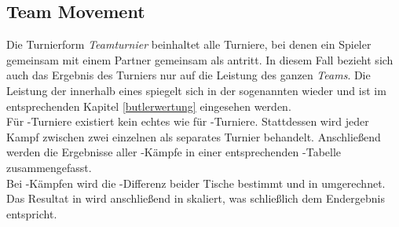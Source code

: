 \subsection{Team Movement}\label{team movement}

\noindent
Die Turnierform \textit{Teamturnier} beinhaltet alle Turniere, bei denen ein Spieler
gemeinsam mit einem Partner gemeinsam als \te antritt. In diesem Fall bezieht sich
auch das Ergebnis des Turniers nur auf die Leistung des ganzen \textit{Teams}.
Die Leistung der \pas innerhalb eines \te spiegelt sich in der sogenannten \bw wieder
und ist im entsprechenden Kapitel \ref{butlerwertung} eingesehen werden.\\[.2cm]

\noindent
Für \te-Turniere existiert kein echtes \bms wie für \pa-Turniere. Stattdessen wird
jeder Kampf zwischen zwei einzelnen \tes als separates Turnier behandelt. Anschließend
werden die Ergebnisse aller \te-Kämpfe in einer entsprechenden \vp-Tabelle
zusammengefasst.\\[.2cm]

\noindent
Bei \te-Kämpfen wird die \scy-Differenz beider Tische bestimmt und in \imps umgerechnet.
Das Resultat in \imps wird anschließend in \vps skaliert, was schließlich dem
Endergebnis entspricht.
